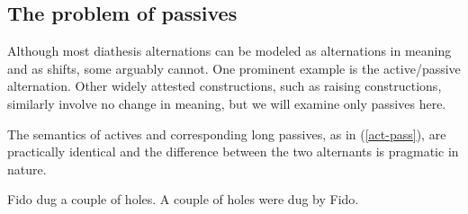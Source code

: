 \documentclass[output=paper
 	        ,biblatex
                ,babelshorthands
                ,newtxmath
                ,draftmode
                ,colorlinks, citecolor=brown
]{langscibook}
\begin{document}
\begin{exe}
	\ex\label{carve-sem}
	\begin{xlist}
	\ex \label{carve-sem-a}
\ex \label{carve-sem-b}
\end{xlist}
\end{exe}
 
\subsection{The problem of passives}
\label{passives}\label{arg-st:sec-passives}
Although most diathesis alternations can be modeled as alternations in meaning and as  shifts, some arguably cannot. 
One prominent example is the active/passive alternation.
Other widely attested constructions, such as raising constructions, similarly involve no change in meaning, but we will examine only passives here. 

The semantics of actives and corresponding long passives, as in (\ref{act-pass}), are practically identical and the difference between the two alternants is pragmatic in nature. 

\begin{exe}
	\ex\label{act-pass}
	\begin{xlist}
		\ex\label{act-pass-a}Fido dug a couple of holes.
		\ex\label{act-pass-b}A couple of holes were dug by Fido.
	\end{xlist}
\end{exe}
\end{document}
